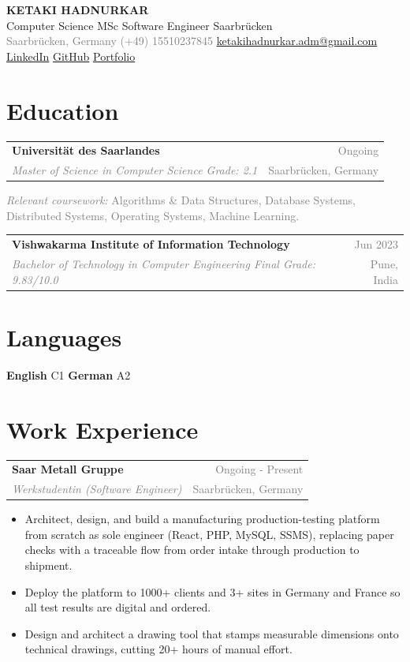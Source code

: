 \documentclass[10pt, letterpaper]{article}
\makeatletter
\newcommand{\resumeEntry}[4]{%
  \vspace{2pt}%
  \noindent
  \begin{tabularx}{\linewidth}{@{}X r@{}}
    \textbf{#1} & \textcolor{gray}{\small #2} \\[-1pt]
    \textit{\textcolor{gray}{\small #3}} & \textcolor{gray}{\small #4}
  \end{tabularx}%
}
\makeatother
\begin{document}
\begin{center}
  {\Large\bfseries\color{accent} KETAKI HADNURKAR}\\[3pt]
  {\small\color{gray} Computer Science MSc \textbar{} Software Engineer \textbar{} Saarbr\"ucken}\\[4pt]
  \textcolor{gray}{\small
    Saarbr\"ucken, Germany \textbar{}
    (+49) 15510237845 \textbar{}
    \href{mailto:ketakihadnurkar.adm@gmail.com}{ketakihadnurkar.adm@gmail.com} \textbar{}
    \href{https://www.linkedin.com/in/ketaki-hadnurkar}{LinkedIn} \textbar{}
    \href{https://github.com/Ketaki1806}{GitHub} \textbar{}
    \href{https://ketaki1806.github.io/}{Portfolio}
  }
\end{center}

\vspace{1pt}

\section{Education}

\resumeEntry{Universit\"at des Saarlandes}{Ongoing}
  {Master of Science in Computer Science \textbar{} Grade: 2.1}{Saarbr\"ucken, Germany}
\textcolor{gray}{\small \textit{Relevant coursework:} Algorithms \& Data Structures, Database Systems, Distributed Systems, Operating Systems, Machine Learning.}

\vspace{1pt}

\resumeEntry{Vishwakarma Institute of Information Technology}{Jun 2023}
  {Bachelor of Technology in Computer Engineering \textbar{} Final Grade: 9.83/10.0}{Pune, India}

\section{Languages}

\vspace{1pt}
\noindent\textbf{English} C1 \qquad \textbf{German} A2

\section{Work Experience}

\resumeEntry{Saar Metall Gruppe}{Ongoing - Present}
  {Werkstudentin (Software Engineer)}{Saarbr\"ucken, Germany}
\begin{itemize}
  \item Architect, design, and build a manufacturing production-testing platform from scratch as sole engineer (React, PHP, MySQL, SSMS), replacing paper checks with a traceable flow from order intake through production to shipment.
  \item Deploy the platform to 1000+ clients and 3+ sites in Germany and France so all test results are digital and ordered.
  \item Design and architect a drawing tool that stamps measurable dimensions onto technical drawings, cutting 20+ hours of manual effort.
\end{itemize}
\end{document}
